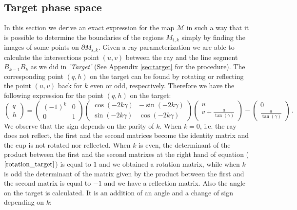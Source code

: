 \subsection{Target phase space}
In this section we derive an exact expression for the map $\mathcal{M}$ in such a way that it is possible to determine the boundaries of the regions $M_{\textrm{t},k}$
simply by finding the images of some points on $\partial M_{\textrm{s},k}$.
 Given a ray parameterization we are able to calculate the intersections point $(u,v)$ between the ray and the line segment $B_{k-1}B_{k}$ as we did in \textit{'Target'} (See Appendix \ref{sec:target} for the procedure).
 The corresponding point $(q,h)$ on the target can be found by rotating or reflecting the point $(u,v)$ back for $k$ even or odd, respectively.
 Therefore we have the following expression for the point $(q,h)$ on the target:
\begin{equation} \label{rotation_target}\begin{pmatrix} q\\ h
\end{pmatrix} = \left(\begin{array}{cc}(-1)^k & 0  \\ 0 & 1\end{array}\right)
\left(\begin{array}{cc}\cos(-2k\gamma) & -\sin(-2k\gamma) \\\sin(-2k\gamma) & \cos(-2k\gamma)\end{array}\right)\begin{pmatrix} u \\
 v+\frac{a}{\tan(\gamma)}\end{pmatrix}-\begin{pmatrix}0 \\ \frac{a}{\tan(\gamma)}\end{pmatrix}\,.
\end{equation} We observe that the sign depends on the parity of $k$. When $k=0$, i.e. the ray does not reflect, the first and the second matrices become the identity matrix and the cup is not rotated nor reflected. When $k$ is even, the determinant of the product between the first and the second matrixes at the right hand of equation ($\ref{rotation_target}$) is equal to $1$ and we obtained a rotation matrix, while when $k$ is odd the determinant of the matrix given by the product between the first and the second matrix is equal to $-1$ and we have a reflection matrix.
Also the angle on the target is calculated. It is an addition of an angle and a change of sign depending on $k$:
